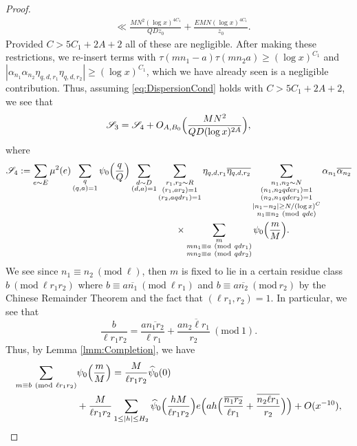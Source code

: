 \documentclass[10pt]{amsart}
\theoremstyle{plain}
\numberwithin{equation}{section}
\newcommand{\Mod}[1]{\ (\mathrm{mod}\ #1)}
\renewcommand{\hat}[1]{\widehat #1}
\begin{document}
\begin{proof}
\begin{align*}
&\ll \frac{MN^2(\log{x})^{4C_1}}{Q D z_0}+\frac{E MN(\log{x})^{4C_1}}{z_0}.
\end{align*}
Provided $C>5C_1+2A+2$ all of these are negligible. After making these restrictions, we re-insert terms with $\tau(m n_1-a)\tau(m n_2a)\ge (\log{x})^{C_1}$ and $|\alpha_{n_1}\alpha_{n_2}\eta_{q,d,r_1}\eta_{q,d,r_2}|\ge(\log{x})^{C_1}$, which we have already seen is a negligible contribution. Thus, assuming \eqref{eq:DispersionCond} holds with $C>5C_1+2A+2$, we see that 
\begin{equation}
\mathscr{S}_{3}=\mathscr{S}_{4}+O_{A,B_0}\Bigl(\frac{MN^2}{Q D (\log{x})^{2A}}\Bigr),\label{eq:S23Estimate}
\end{equation}
where
\begin{align*}
\mathscr{S}_{4}:=\sum_{e\sim E}\mu^2(e)\sum_{\substack{q\\ (q,a)=1}}\psi_0\Bigl(\frac{q}{Q}\Bigr)\sum_{\substack{d\sim D\\ (d,a)=1}}&\sum_{\substack{r_1,r_2\sim R\\ (r_1,a r_2)=1\\ (r_2,a q d r_1)=1}}\eta_{q,d,r_1}\overline{\eta_{q,d,r_2}} \sum_{\substack{n_1,n_2\sim N\\ (n_1,n_2 q d e r_1)=1\\(n_2,n_1 q d e r_2)=1\\ |n_1-n_2|\ge N/(\log{x})^C\\ n_1\equiv n_2\Mod{qde}}}\alpha_{n_1}\overline{\alpha_{n_2}}\\
&\qquad\times\sum_{\substack{m\\ m n_1\equiv a\Mod{q d r_1}\\ m n_2\equiv a\Mod{q d r_2}}} \psi_0\Bigl(\frac{m}{M}\Bigr).
\end{align*}
We see since $n_1\equiv n_2\Mod{\ell}$, then $m$ is fixed to lie in a certain residue class $b\Mod{\ell r_1r_2}$ where $b\equiv a\overline{n_1}\Mod{\ell r_1}$ and $b\equiv a\overline{n_2}\Mod{r_2}$ by the Chinese Remainder Theorem and the fact that $(\ell r_1,r_2)=1$. In particular, we see that
\[
\frac{b}{\ell r_1 r_2}=\frac{a\overline{n_1 r_2}}{\ell r_1}+\frac{a \overline{n_2 \ell r_1}}{r_2}\Mod{1}.
\]
Thus, by Lemma \ref{lmm:Completion}, we have
\begin{align*}
\sum_{m\equiv b\Mod{\ell r_1 r_2}}&\psi_0\Bigl(\frac{m}{M}\Bigr)=\frac{M}{\ell r_1 r_2}\hat{\psi}_0(0)\\
&+\frac{M}{\ell r_1 r_2}\sum_{1\le |h|\le H_2}\hat{\psi}_0\Bigl(\frac{h M}{\ell r_1 r_2}\Bigr)e\Bigl(ah\Bigl(\frac{\overline{n_1r_2}}{\ell r_1}+\frac{\overline{n_2 \ell r_1}}{r_2}\Bigr)\Bigr)+O(x^{-10}),

\end{align*}
\end{proof}
\end{document}
